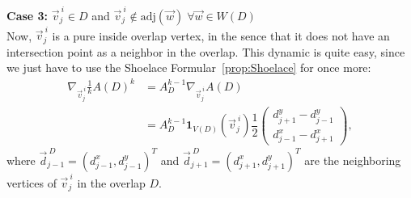 \begin{proposition}
	\textbf{Case 3:} $\vec{v}_j^{\: i} \in D$ and $\vec{v}_j^{\: i} \notin \text{adj}(\vec{w}) \; \forall \vec{w} \in W(D)$\\
	Now, $\vec{v}_j^{\: i}$ is a pure inside overlap vertex, in the sence that it does not have an intersection point as a neighbor in the overlap. 
	This dynamic is quite easy, since we just have to use the Shoelace Formular~\ref{prop:Shoelace} for once more: 
	\begin{align*}
		\nabla_{\vec{v}_j^{\: i}} \frac{1}{k} A(D)^k 
		&= A_{D}^{k-1} \nabla_{\vec{v}_j^{\: i}} A(D) \\
		&= A_{D}^{k-1} \mathbf{1}_{V(D)}(\vec{v}_j^{\: i}) \dfrac{1}{2} \begin{pmatrix} d_{j+1}^{y} - d_{j-1}^{y} \\[0.5em]  d_{j-1}^{x} - d_{j+1}^{x} \end{pmatrix},
	\end{align*}
	where $\vec{d}_{j-1}^{\: D} = (d_{j-1}^{x}, d_{j-1}^{y})^T$ and $\vec{d}_{j+1}^{\: D} = (d_{j+1}^{x}, d_{j+1}^{y})^T$ are the neighboring vertices of $\vec{v}_j^{\: i}$ in the overlap $D$.\\


\end{proposition}
